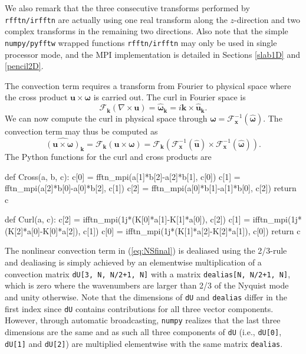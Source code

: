 \documentclass[11pt, oneside]{article}
\newcommand{\inpyth}{\lstinline[style=pythonstyle, basicstyle=\ttfamily]} %[]%
\begin{document}
We also remark that the three consecutive transforms performed by \inpyth{rfftn/irfftn} are actually using one real transform along the $z$-direction and two complex transforms in the remaining two directions. Also note that the simple \texttt{numpy/pyfftw} wrapped functions \inpyth{rfftn/irfftn} may only be used in single processor mode, and the MPI implementation is detailed in Sections
\ref{slab1D} and \ref{pencil2D}.

The convection term requires a transform from Fourier to physical space where the cross product $\bm{u} \times \bm{\omega}$ is carried out. The curl in Fourier space is
\begin{equation}
\mathcal{F}_{\bm{k}}(\nabla \times \bm{u}) = \hat{\bm{\omega}}_{\bm{k}} = i \bm{k} \times \hat{\bm{u}}_{\bm{k}}.
\end{equation}
We can now compute the curl in physical space through $\bm{\omega} = \mathcal{F}_{\bm{x}}^{-1}(\hat{\bm{\omega}})$. The convection term may thus be computed as
\begin{equation}
\widehat{( \bm{u} \times \bm{\omega})}_{\bm{k}} = \mathcal{F}_{\bm{k}}(\bm{u} \times \bm{\omega}) = \mathcal{F}_{\bm{k}} (\mathcal{F}^{-1}_{\bm{x}}(\hat{\bm{u}}) \times \mathcal{F}^{-1}_{\bm{x}}(\hat{\bm{\omega}})).
\end{equation}
The Python functions for the curl and cross products are

\begin{python}
def Cross(a, b, c):
    c[0] = fftn_mpi(a[1]*b[2]-a[2]*b[1], c[0])
    c[1] = fftn_mpi(a[2]*b[0]-a[0]*b[2], c[1])
    c[2] = fftn_mpi(a[0]*b[1]-a[1]*b[0], c[2])
    return c

def Curl(a, c):
    c[2] = ifftn_mpi(1j*(K[0]*a[1]-K[1]*a[0]), c[2])
    c[1] = ifftn_mpi(1j*(K[2]*a[0]-K[0]*a[2]), c[1])
    c[0] = ifftn_mpi(1j*(K[1]*a[2]-K[2]*a[1]), c[0])
    return c
\end{python}

The nonlinear convection term in (\ref{eq:NSfinal}) is dealiased using the 2/3-rule and dealiasing is simply achieved by an elementwise multiplication of a convection matrix \inpyth{dU[3, N, N/2+1, N]} with a matrix \inpyth{dealias[N, N/2+1, N]}, which is zero where the wavenumbers are larger than 2/3 of the Nyquist mode and unity otherwise. Note that the dimensions of \inpyth{dU} and \inpyth{dealias} differ in the first index since \inpyth{dU} contains contributions for all three vector components. However, through automatic broadcasting, \texttt{numpy} realizes that the last three dimensions are the same and as such all three components of \inpyth{dU} (i.e.,  \inpyth{dU[0]}, \inpyth{dU[1]} and  \inpyth{dU[2]}) are multiplied elementwise with the same matrix \inpyth{dealias}.
\end{document}
